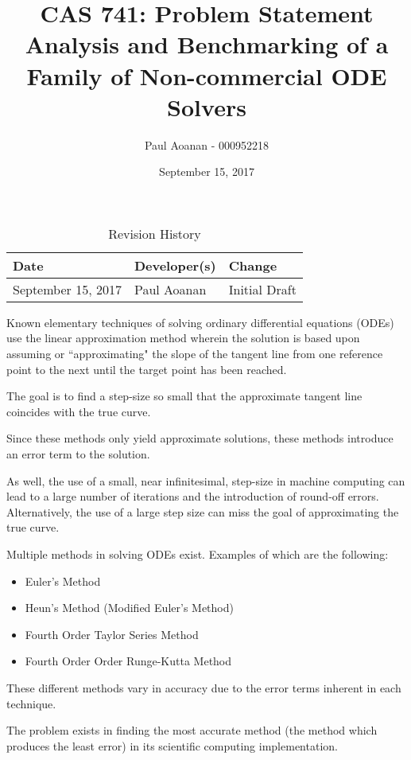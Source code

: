 \documentclass{article}
\title{CAS 741: Problem Statement\\Analysis and Benchmarking of a Family of Non-commercial ODE Solvers}
\author{Paul Aoanan - 000952218}
\date{September 15, 2017}
\begin{document}
\maketitle

\begin{table}[hp]
\caption{Revision History} \label{TblRevisionHistory}
\begin{tabularx}{\textwidth}{llX}
\toprule
\textbf{Date} & \textbf{Developer(s)} & \textbf{Change}\\
\midrule
September 15, 2017 & Paul Aoanan & Initial Draft\\
\bottomrule
\end{tabularx}
\end{table}

Known elementary techniques of solving ordinary differential equations (ODEs) use the linear
approximation method wherein the solution is based upon assuming or ``approximating" the slope
of the tangent line from one reference point to the next until the target point has been
reached.

The goal is to find a step-size so small that the approximate tangent line coincides
with the true curve.

Since these methods only yield approximate solutions, these methods introduce an error term to
the solution.

As well, the use of a small, near infinitesimal, step-size in machine computing can lead to a
large number of iterations and the introduction of round-off errors. Alternatively, the use of a
large step size can miss the goal of approximating the true curve.

Multiple methods in solving ODEs exist.
Examples of which are the following:
\begin{itemize}
	\item Euler's Method
	\item Heun's Method (Modified Euler's Method)
	\item Fourth Order Taylor Series Method
	\item Fourth Order Order Runge-Kutta Method
\end{itemize}

These different methods vary in accuracy due to the error terms inherent in each technique.

The problem exists in finding the most accurate method (the method which produces the least error) in its scientific computing implementation.




\end{document}
